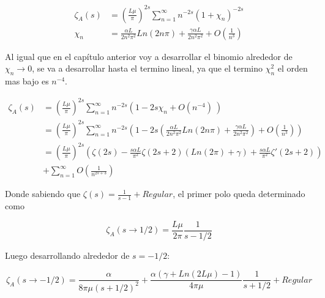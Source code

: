 \begin{equation}
\begin{aligned}
    \zeta _A (s) &= \left( \frac{L \mu }{\pi} \right)  ^{2 s} 
    \sum _{n=1} ^{\infty} n ^{- 2  s} 
    \left(
    	1 + \chi _n 
    	\right) ^{-2 s} \\[5pt]
		 \chi _n &= 
    	\frac{\alpha L  }{2 n^2 \pi ^2} Ln(2 n \pi) + 
    	\frac{\gamma \alpha L}{2 n^2 \pi ^2 } +
    	O \left(
    		\frac{1}{n^3} \right) 
\end{aligned}
\end{equation}

Al igual que en el capítulo anterior voy a desarrollar el binomio alrededor de  $\chi _n \rightarrow 0$, se va a desarrollar hasta el termino lineal, ya que el termino $\chi _n ^2 $ el orden mas bajo es $n ^{-4} $. 


\begin{align}
    \zeta _A (s) &= \left( \frac{L \mu}{\pi} \right) ^{2 s}
    \sum _{n=1} ^{\infty} 
    n ^{-2s}
    \left(
    1 - 2 s \chi _n + O(n ^{-4}) \
    \right)   \nonumber \\[5pt]
     &= \left( \frac{L \mu }{\pi} \right) ^{2 s}
    \sum _{n=1} ^{\infty} n ^{-2 s} 
    \left(
    1 - 2s \left(
    \frac{\alpha L }{2 n ^2 \pi ^2} Ln( 2  n \pi) + 
    \frac{\gamma \alpha L }{2 n ^2 \pi ^2} 
	\right) +
    O \left( \frac{1}{n ^{3} }  \right)
    \right) \nonumber \\[5pt]
    &=   \left( \frac{L \mu }{ \pi } \right) ^{2 s}  
    \left( \zeta (2 s) -
	\frac{ s \alpha L}{ \pi ^2} \zeta (2s+2)
	\left(
	   Ln(2  \pi ) + \gamma
	\right) + 
    \frac{s \alpha L}{\pi ^2}
	\zeta '(2s+2) \right) \nonumber \\[5pt]
	&  + \sum _{n=1} ^{\infty} O \left( \frac{1}{n ^{2s+3}} \right)
\end{align}    
  
Donde sabiendo que $\zeta(s) = \frac{1}{s-1} + Regular$, el primer polo queda determinado como

\begin{equation}
    \zeta _A (s \rightarrow 1/2) = \frac{L \mu }{2 \pi} \frac{1}{s-1/2}    
\end{equation}

Luego desarrollando alrededor de $s=-1/2$:

\begin{equation}
    \zeta _A (s \rightarrow -1/2 ) =  \frac{\alpha}{8  \pi \mu (s+1/2)^2} +
     \frac{ \alpha ( \gamma  + Ln(2L \mu ) -1 ) }{4  \pi \mu } \frac{1}{s+1/2} + 
    Regular
\end{equation}

